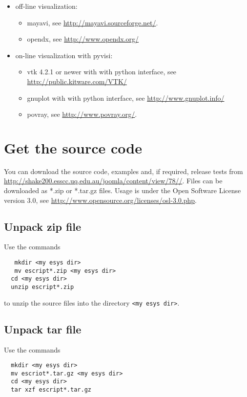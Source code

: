 \begin{itemize}
   \item off-line visualization:
      \begin{itemize}
      \item mayavi, see \url{http://mayavi.sourceforge.net/}.
      \item opendx, see \url{http://www.opendx.org/}
      \end{itemize}
   \item on-line visualization with pyvisi:
\begin{itemize}
      \item vtk  4.2.1 or newer with with python interface, see \url{http://public.kitware.com/VTK/}
      \item gnuplot  with with python interface, see \url{http://www.gnuplot.info/}
      \item  povray, see \url{http://www.povray.org/}.
\end{itemize}
\end{itemize}

\section{Get the source code}

You can download the source code, examples and, if required, release tests from \url{http://shake200.esscc.uq.edu.au/joomla/content/view/78//}.
Files can be downloaded as *.zip or *.tar.gz files. 
Usage is under the Open Software License version 3.0, see \url{http://www.opensource.org/licenses/osl-3.0.php}.

\subsection{Unpack zip file}
Use the commands

\begin{verbatim}
   mkdir <my esys dir>
   mv escript*.zip <my esys dir>
  cd <my esys dir>
  unzip escript*.zip
\end{verbatim}

to unzip the source files into the directory  \verb|<my esys dir>|.

\subsection{Unpack tar file}
  
Use the commands

\begin{verbatim}
  mkdir <my esys dir>
  mv escriot*.tar.gz <my esys dir>
  cd <my esys dir>
  tar xzf escript*.tar.gz
\end{verbatim}

